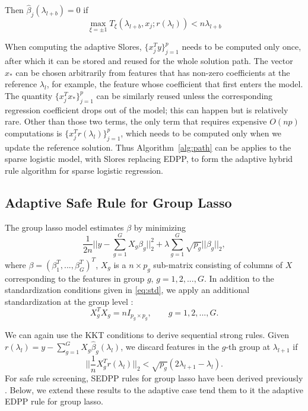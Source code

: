 \begin{theorem}
Then $\hat{\beta}_j(\lambda_{l+b})=0$ if
  \begin{equation}
    \max_{\xi=\pm1} T_\xi(\lambda_{l+b},x_j;r(\lambda_l))<n\lambda_{l+b}
  \end{equation}
\end{theorem}

When computing the adaptive Slores, $\{x_j^Ty\}_{j=1}^p$ needs to be computed only once, after which it can be stored and reused for the whole solution path. The vector $x_*$ can be chosen arbitrarily from features that has non-zero coefficients at the reference $\lambda_l$, for example, the feature whose coefficient that first enters the model. The quantity $\{x_j^Tx_*\}_{j=1}^p$ can be similarly reused unless the corresponding regression coefficient drops out of the model; this can happen but is relatively rare. Other than those two terms, the only term that requires expensive $O(np)$ computations is $\{x_j^Tr(\lambda_l)\}_{j=1}^p$, which needs to be computed only when we update the reference solution. Thus Algorithm~\ref{alg:path} can be applies to the sparse logistic model, with Slores replacing EDPP, to form the adaptive hybrid rule algorithm for sparse logistic regression.

\subsection{Adaptive Safe Rule for Group Lasso}
\label{sec:group}

The group lasso model \citep{yuan2006model} estimates $\beta$ by minimizing
\begin{equation}
    \label{eq:glasso}
    \frac{1}{2n}\bigg|\bigg|y - \sum_{g=1}^GX_g\beta_g\bigg|\bigg|_2^2 + \lambda\sum_{g=1}^G\sqrt{p_g}||\beta_g||_2,
\end{equation}
where $\beta=(\beta_1^T,...,\beta_G^T)^T$, $X_g$ is a $n\times p_g$ sub-matrix consisting of columns of $X$ corresponding to the features in group $g$, $g=1,2,...,G$. In addition to the standardization conditions given in \eqref{eq:std}, we apply an additional standardization at the group level \citep{breheny2015group}:
\begin{equation}
    \label{eq:stdg}
    X_g^TX_g=nI_{p_g\times p_g},\qquad g=1,2,...,G.
\end{equation}

We can again use the KKT conditions to derive sequential strong rules. Given $r(\lambda_l)=y-\sum_{g=1}^GX_g\hat{\beta}_g(\lambda_l)$, we discard features in the $g$-th group at $\lambda_{l+1}$ if
\begin{equation} \bigg|\bigg|\frac{1}{n}X_g^Tr(\lambda_l)\bigg|\bigg|_2<\sqrt{p_g}(2\lambda_{l+1}-\lambda_l).
\end{equation}
For safe rule screening, SEDPP rules for group lasso have been derived previously \citep{wang2013lasso}. Below, we extend these results to the adaptive case tend them to it the adaptive EDPP rule for group lasso.

